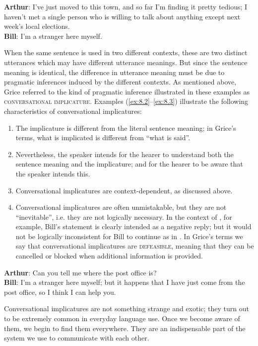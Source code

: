 \ea \label{ex:8.3}
\textbf{Arthur}: I’ve just moved to this town, and so far I’m finding it pretty tedious; I haven’t met a single person who is willing to talk about anything except next week’s local elections.\\
\textbf{Bill}: I’m a stranger here myself.
\z


When the same sentence is used in two different contexts, these are two distinct utterances which may have different utterance meanings. But since the sentence meaning is identical, the difference in utterance meaning must be due to pragmatic inferences induced by the different contexts. As mentioned above, Grice referred to the kind of pragmatic inference illustrated in these examples as \textsc{conversational implicature}. Examples (\ref{ex:8.2}--\ref{ex:8.3}) illustrate the following characteristics of conversational implicatures:


\begin{enumerate}
\item The implicature is different from the literal sentence meaning; in Grice’s terms, what is implicated is different from “what is said”.
\item Nevertheless, the speaker intends for the hearer to understand both the sentence meaning and the implicature; and for the hearer to be aware that the speaker intends this.
\item Conversational implicatures are context-dependent, as discussed above.
\item Conversational implicatures are often unmistakable, but they are not “inevitable”, i.e. they are not logically necessary. In the context of , for example, Bill’s statement is clearly intended as a negative reply; but it would not be logically inconsistent for Bill to continue as in . In Grice’s terms we say that conversational implicatures are \textsc{defeasible}, meaning that they can be cancelled or blocked when additional information is provided.
\end{enumerate}

\ea \label{ex:8.4}
\textbf{Arthur}: Can you tell me where the post office is?\\
\textbf{Bill}: I’m a stranger here myself; but it happens that I have just come from the post office, so I think I can help you.
\z


Conversational implicatures are not something strange and exotic; they turn out to be extremely common in everyday language use. Once we become aware of them, we begin to find them everywhere. They are an indispensable part of the system we use to communicate with each other.


